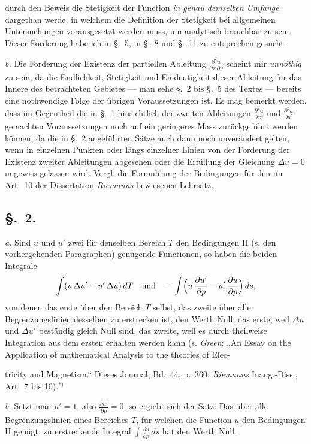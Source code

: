 \documentclass{article}
\begin{document}
durch den Beweis die Stetigkeit der Function \emph{in genau demselben Umfange} dargethan werde, in welchem die Definition der Stetigkeit bei allgemeinen Untersuchungen vorausgesetzt werden muss, um analytisch brauchbar zu sein. Dieser Forderung habe ich in §.~5, in §.~8 und §.~11 zu entsprechen gesucht.

\emph{b.} Die Forderung der Existenz der partiellen Ableitung $\frac{\partial^2 u}{\partial x\,\partial y}$ scheint mir \emph{unnöthig} zu sein, da die Endlichkeit, Stetigkeit und Eindeutigkeit dieser Ableitung für das Innere des betrachteten Gebietes --- man sehe §.~2 bis §.~5 des Textes --- bereits eine nothwendige Folge der übrigen Voraussetzungen ist. Es mag bemerkt werden, dass im Gegentheil die in §.~1 hinsichtlich der zweiten Ableitungen $\frac{\partial^2 u}{\partial x^2}$ und $\frac{\partial^2 u}{\partial y^2}$ gemachten Voraussetzungen noch auf ein geringeres Mass zurückgeführt werden können, da die in §.~2 angeführten Sätze auch dann noch unverändert gelten, wenn in einzelnen Punkten oder längs einzelner Linien von der Forderung der Existenz zweiter Ableitungen abgesehen oder die Erfüllung der Gleichung $\Delta u = 0$ ungewiss gelassen wird. Vergl. die Formulirung der Bedingungen für den im Art.~10 der Dissertation \emph{Riemanns} bewiesenen Lehrsatz.

\subsection*{§.~2.}

\emph{a.} Sind $u$ und $u'$ zwei für denselben Bereich $T$ den Bedingungen II (s. den vorhergehenden Paragraphen) genügende Functionen, so haben die beiden Integrale
\[
\int (u\,\Delta u' - u'\,\Delta u)\,dT \quad \text{und} \quad -\int \Bigl(u\,\frac{\partial u'}{\partial p} - u'\,\frac{\partial u}{\partial p}\Bigr)\,ds,
\]
von denen das erste über den Bereich $T$ selbst, das zweite über alle Begrenzungslinien desselben zu erstrecken ist, den Werth Null; das erste, weil $\Delta u$ und $\Delta u'$ beständig gleich Null sind, das zweite, weil es durch theilweise Integration aus dem ersten erhalten werden kann (s. \emph{Green}: „An Essay on the Application of mathematical Analysis to the theories of Elec-

tricity and Magnetism.“ Dieses Journal, Bd.~44, p.~360; \emph{Riemanns} Inaug.-Diss., Art.~7 bis 10).${}^{*)}$

\emph{b.} Setzt man $u' = 1$, also $\frac{\partial u'}{\partial p} = 0$, so ergiebt sich der Satz: Das über alle Begrenzungslinien eines Bereiches $T$, für welchen die Function $u$ den Bedingungen II genügt, zu erstreckende Integral $\displaystyle\int \frac{\partial u}{\partial p}\,ds$ hat den Werth Null.
\end{document}
